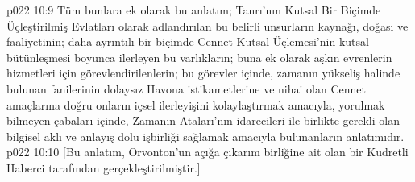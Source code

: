 \vs p022 10:9 Tüm bunlara ek olarak bu anlatım; Tanrı’nın Kutsal Bir Biçimde Üçleştirilmiş Evlatları olarak adlandırılan bu belirli unsurların kaynağı, doğası ve faaliyetinin; daha ayrıntılı bir biçimde Cennet Kutsal Üçlemesi’nin kutsal bütünleşmesi boyunca ilerleyen bu varlıkların; buna ek olarak aşkın evrenlerin hizmetleri için görevlendirilenlerin; bu görevler içinde, zamanın yükseliş halinde bulunan fanilerinin dolaysız Havona istikametlerine ve nihai olan Cennet amaçlarına doğru onların içsel ilerleyişini kolaylaştırmak amacıyla, yorulmak bilmeyen çabaları içinde, Zamanın Ataları’nın idarecileri ile birlikte gerekli olan bilgisel aklı ve anlayış dolu işbirliği sağlamak amacıyla bulunanların anlatımıdır.
\vs p022 10:10 [Bu anlatım, Orvonton’un açığa çıkarım birliğine ait olan bir Kudretli Haberci tarafından gerçekleştirilmiştir.]
